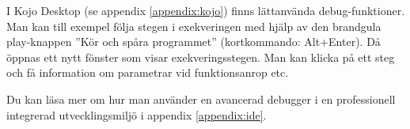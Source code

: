 \noindent I Kojo Desktop (se appendix \ref{appendix:kojo}) finns lättanvända debug-funktioner. Man kan till exempel följa stegen i exekveringen med hjälp av den brandgula play-knappen ''Kör och spåra programmet'' (kortkommando: Alt+Enter). Då öppnas ett nytt fönster som visar exekveringsstegen. Man kan klicka på ett steg och få  information om parametrar vid funktionsanrop etc.

Du kan läsa mer om hur man använder en avancerad debugger i en professionell integrerad utvecklingsmiljö i appendix \ref{appendix:ide}.

